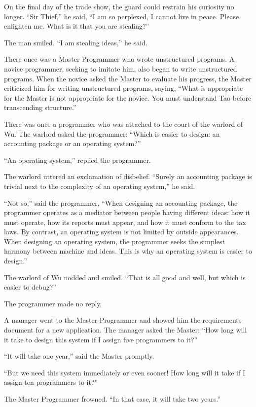 On the final day of the trade show, the guard could restrain his
curiosity no longer. ``Sir Thief,'' he said, ``I am so perplexed, I
cannot live in peace. Please enlighten me. What is it that you are
stealing?''

The man smiled. ``I am stealing ideas,'' he said.

There once was a Master Programmer who wrote unstructured programs. A
novice programmer, seeking to imitate him, also began to write
unstructured programs. When the novice asked the Master to evaluate
his progress, the Master criticized him for writing unstructured
programs, saying, ``What is appropriate for the Master is not
appropriate for the novice. You must understand Tao before
transcending structure.''

There was once a programmer who was attached to the court of the
warlord of Wu. The warlord asked the programmer: ``Which is easier to
design: an accounting package or an operating system?''

``An operating system,'' replied the programmer.

The warlord uttered an exclamation of disbelief. ``Surely an
accounting package is trivial next to the complexity of an operating
system,'' he said.

``Not so,'' said the programmer, ``When designing an accounting
package, the programmer operates as a mediator between people having
different ideas: how it must operate, how its reports must appear, and
how it must conform to the tax laws. By contrast, an operating system
is not limited by outside appearances. When designing an operating
system, the programmer seeks the simplest harmony between machine and
ideas. This is why an operating system is easier to design.''

The warlord of Wu nodded and smiled. ``That is all good and well, but
which is easier to debug?''

The programmer made no reply.

A manager went to the Master Programmer and showed him the
requirements document for a new application. The manager asked the
Master: ``How long will it take to design this system if I assign five
programmers to it?''

``It will take one year,'' said the Master promptly.

``But we need this system immediately or even sooner! How long will it
take if I assign ten programmers to it?''

The Master Programmer frowned. ``In that case, it will take two years.''

